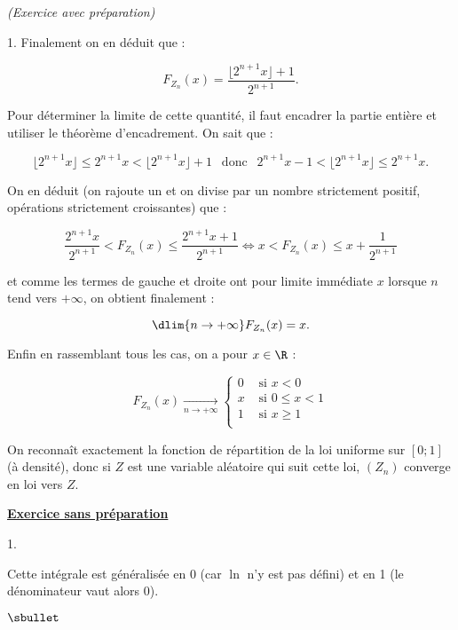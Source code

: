 \documentclass[11pt]{article}%
\begin{document}
\begin{exercice}{\it (Exercice avec préparation)}
\begin{noliste}{1.}
 Finalement on en déduit que : 
 
\[
 F_{ Z_{n} } (x) = \frac{ \lfloor 2^{ n + 1 } x \rfloor + 1 }{ 2^{ n +
1 } }. 
\]

 Pour déterminer la limite de cette quantité, il faut encadrer la
partie entière et utiliser le théorème d'encadrement. On sait que : 
 
\[
 \lfloor 2^{ n + 1 } x \rfloor \leq 2^{n + 1} x < \lfloor 2^{ n + 1 } x
\rfloor + 1 \ \ \text{ donc } \ \ 2^{ n + 1 } x - 1 < \lfloor 2^{ n + 1
} x \rfloor \leq 2^{n + 1} x. 
\]

 On en déduit (on rajoute un et on divise par un nombre strictement
positif, opérations strictement croissantes) que : 
 
\[
 \frac{ 2^{n + 1} x }{ 2^{n + 1} } < F_{ Z_{n} } (x) \leq \frac{ 2^{n +
1} x + 1 }{ 2^{ n + 1 } } \Longleftrightarrow x < F_{ Z_{n} } (x) \leq
x + \frac{ 1 }{ 2^{ n + 1 } } 
\]

 et comme les termes de gauche et droite ont pour limite immédiate $x$
lorsque $n$ tend vers $ + \infty$, on obtient finalement : 
 
\[
 \dlim{ n \rightarrow + \infty } F_{ Z_{n} } (x) = x. 
\]

 Enfin en rassemblant tous les cas, on a pour $x \in \R$ : 
 
\[
 F_{ Z_{n} } (x) \xrightarrow[ n \rightarrow + \infty ]{} \left\{\begin{array}{cl}
 0 & \text{ si } x < 0 \\
x & \text{ si } 0 \leq x < 1 \\
1 & \text{ si } x \geq 1 \\
\end{array}
\right. 
\]

 On reconnaît exactement la fonction de répartition de la loi uniforme
sur $[0 ; 1]$ (à densité), donc si $Z$ est une variable aléatoire qui
suit cette loi, $(Z_{n})$ converge en loi vers $Z$.

 \end{noliste}

 \noindent \textbf{\underline{Exercice sans préparation}} \\

 \begin{noliste}{1.}
 \setlength{\itemsep}{4mm}

 \item Cette intégrale est généralisée en 0 (car $\ln$ n'y est pas
défini) et en 1 (le dénominateur vaut alors 0). \\
\begin{noliste}{$\sbullet$}


\end{noliste}
\end{noliste}
\end{exercice}
\end{document}
